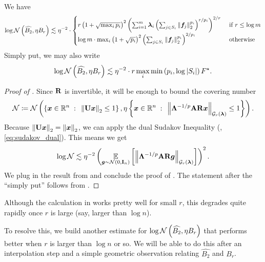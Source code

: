 \documentclass[11pt]{article}
\numberwithin{equation}{section}
\begin{document}
\begin{lemma}
\label{lemma:r_to_two}
We have
\begin{align*}
    \log\mathcal{N}\left(\widehat{B_2},\eta B_r\right) \lesssim \eta^{-2} \cdot  \begin{cases} r\left(1+\sqrt{\max_i p_i}\right)^2\left(\sum_{i=1}^m \bm{\lambda}_i \left(\sum_{j \in S_i} \left\lVert \bm{f}_j \right\rVert_{2}^{p_i}\right)^{r/p_i}\right)^{2/r} & \text{ if } r \le \log m \\ \log m \cdot \max_i \left(1+\sqrt{p_i}\right)^2\left(\sum_{j \in S_i} \left\lVert \bm{f}_j \right\rVert_{2}^{p_i}\right)^{2/p_i} & \text{ otherwise} \end{cases}
\end{align*}
Simply put, we may also write
\begin{align*}
    \log\mathcal{N}\left(\widehat{B_2},\eta B_r\right) \lesssim \eta^{-2} \cdot r\max_{i}\min\left(p_i, \log\left\lvert S_i \right\rvert\right)F^{\star}.
\end{align*}
\end{lemma}
\begin{proof}[Proof of ]
Since $\mathbf{R}$ is invertible, it will be enough to bound the covering number
\begin{align*}
    \mathcal{N} \coloneqq \mathcal{N}\left(\left\{\bm{x}\in\mathbb{R}^n {\;\; : \;\;} \left\lVert \mathbf{U}\bm{x} \right\rVert_2 \le 1\right\}, \eta\left\{\bm{x}\in\mathbb{R}^n {\;\; : \;\;} \left\lVert \mathbf{\Lambda}^{-1/p}\mathbf{A}\mathbf{R}\bm{x} \right\rVert_{\mathcal{G}_{r}(\bm{\lambda})} \le 1\right\}\right).
\end{align*}
Because $\left\lVert \mathbf{U}\bm{x} \right\rVert_2 = \left\lVert \bm{x} \right\rVert_2$, we can apply the dual Sudakov Inequality (, \eqref{eq:sudakov_dual}). This means we get
\begin{align*}
    \log\mathcal{N} \lesssim \eta^{-2} \left(\underset{\bm{g}\sim\mathcal{N}(0,\mathbf{I}_n)}{\mathbb{E}}\left[\left\lVert \mathbf{\Lambda}^{-1/p}\mathbf{A}\mathbf{R}\bm{g} \right\rVert_{\mathcal{G}_{r}(\bm{\lambda})}\right]\right)^2.
\end{align*}
We plug in the result from  and conclude the proof of . The statement after the ``simply put'' follows from .
\end{proof}

Although the calculation in  works pretty well for small $r$, this degrades quite rapidly once $r$ is large (say, larger than $\log n$).

To resolve this, we build another estimate for $\log\mathcal{N}\left(\widehat{B_2},\eta B_r\right)$ that performs better when $r$ is larger than $\log n$ or so. We will be able to do this after an interpolation step and a simple geometric observation relating $\widehat{B_2}$ and $B_r$.

\end{document}
